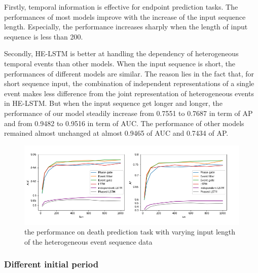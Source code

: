 \documentclass[letterpaper]{article} %
\begin{document}
Firstly, temporal information is effective for endpoint prediction tasks. The performances of most models improve with the increase of the input sequence length. Especially, the performance increases sharply when the length of input sequence is less than 200.

Secondly, HE-LSTM is better at handling the dependency of heterogeneous temporal events than other models.
When the input sequence is short, the performances of different models are similar. The reason lies in the fact that, for short sequence input, the combination of independent representations of a single event makes less difference from the joint representation of heterogeneous events in HE-LSTM.
But when the input sequence get longer and longer, the performance of our model steadily increase from 0.7551 to 0.7687 in term of AP and from 0.9482 to 0.9516 in term of AUC. The performance of other models remained almost unchanged at almost 0.9465 of AUC and 0.7434 of AP.

\begin{figure}[!t]
\centering
\includegraphics[width=1.1\linewidth]{differ_len.png}

\caption{the performance on death prediction task with varying input length of the heterogeneous event sequence data }

\label{fig:length}
\end{figure}







\subsubsection{Different initial period}
\end{document}
